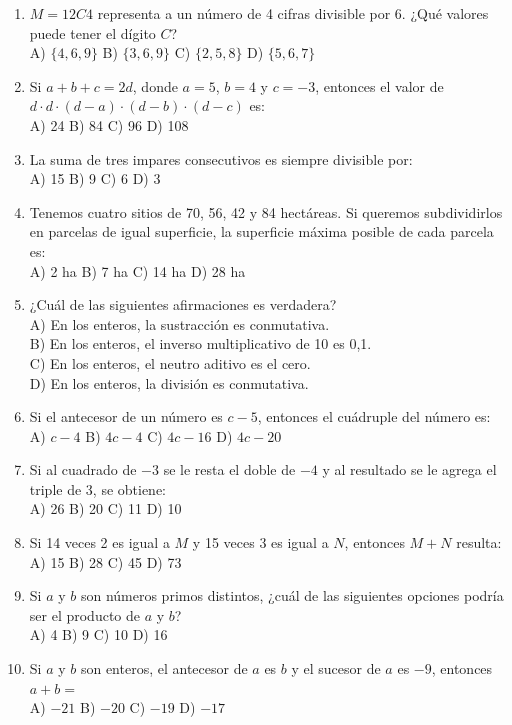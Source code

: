 \documentclass[11pt,letterpaper]{article}
\begin{document}
\begin{enumerate}[label=\textbf{\arabic*.}, leftmargin=*, itemsep=7pt]
\item $M=12C4$ representa a un número de 4 cifras divisible por 6. ¿Qué valores puede tener el dígito $C$?\\ A) $\{4,6,9\}$ \quad B) $\{3,6,9\}$ \quad C) $\{2,5,8\}$ \quad D) $\{5,6,7\}$
\item Si $a+b+c=2d$, donde $a=5$, $b=4$ y $c=-3$, entonces el valor de $d\cdot d\cdot(d-a)\cdot(d-b)\cdot(d-c)$ es: \\ A) 24 \quad B) 84 \quad C) 96 \quad D) 108
\item La suma de tres impares consecutivos es siempre divisible por: \\ A) 15 \quad B) 9 \quad C) 6 \quad D) 3
\item Tenemos cuatro sitios de 70, 56, 42 y 84 hectáreas. Si queremos subdividirlos en parcelas de igual superficie, la superficie máxima posible de cada parcela es: \\ A) 2 ha \quad B) 7 ha \quad C) 14 ha \quad D) 28 ha
\item ¿Cuál de las siguientes afirmaciones es verdadera?\\ A) En los enteros, la sustracción es conmutativa.\\ B) En los enteros, el inverso multiplicativo de 10 es 0,1.\\ C) En los enteros, el neutro aditivo es el cero.\\ D) En los enteros, la división es conmutativa.
\item Si el antecesor de un número es $c-5$, entonces el cuádruple del número es: \\ A) $c-4$ \quad B) $4c-4$ \quad C) $4c-16$ \quad D) $4c-20$
\item Si al cuadrado de $-3$ se le resta el doble de $-4$ y al resultado se le agrega el triple de 3, se obtiene: \\ A) 26 \quad B) 20 \quad C) 11 \quad D) 10
\item Si 14 veces 2 es igual a $M$ y 15 veces 3 es igual a $N$, entonces $M+N$ resulta: \\ A) 15 \quad B) 28 \quad C) 45 \quad D) 73
\item Si $a$ y $b$ son números primos distintos, ¿cuál de las siguientes opciones podría ser el producto de $a$ y $b$?\\ A) 4 \quad B) 9 \quad C) 10 \quad D) 16
\item Si $a$ y $b$ son enteros, el antecesor de $a$ es $b$ y el sucesor de $a$ es $-9$, entonces $a+b=$\\ A) $-21$ \quad B) $-20$ \quad C) $-19$ \quad D) $-17$

\end{enumerate}
\end{document}
